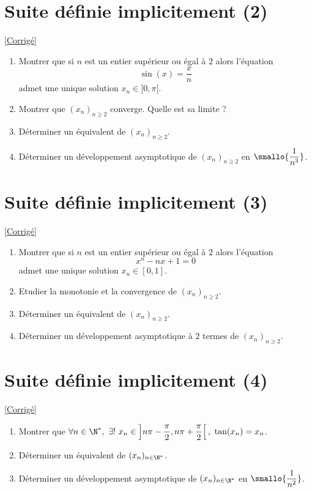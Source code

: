 \documentclass{book}
\begin{document}
	\section{Suite définie implicitement (2) }
	\textcolor{blue}{\hyperref[sec:suite-definie-implicitement-2]{[Corrigé]}}\\
	\label{Suite définie implicitement 2}
	\begin{enumerate}[leftmargin=*]
		\item Montrer que si $n$ est un entier supérieur ou égal à $2$ alors l'équation
		$$\sin(x)=\frac{x}{n}$$
		admet une unique solution $x_n\in ]0,\pi[$.
		\item Montrer que $(x_n)_{n\geq 2}$ converge. Quelle est sa limite ?
		\item Déterminer un équivalent de $(x_n)_{n\geq 2}$.
		\item Déterminer un développement asymptotique de $(x_n)_{n\geq 2}$ en $\smallo{\displaystyle\frac{1}{n^3}}$.
	\end{enumerate}
	
	\section{Suite définie implicitement (3) }
	\textcolor{blue}{\hyperref[sec:suite-definie-implicitement-3]{[Corrigé]}}\\
	\label{Suite définie implicitement 3}
	\begin{enumerate}[leftmargin=*]
		\item Montrer que si $n$ est un entier supérieur ou égal à $2$ alors l'équation
		$$x^n-nx+1=0$$
		admet une unique solution $x_n\in [0,1]$.
		\item Etudier la monotonie et la convergence de $(x_n)_{n\geq 2}$.
		\item Déterminer un équivalent de $(x_n)_{n\geq 2}$.
		\item Déterminer un développement asymptotique à $2$ termes de $(x_n)_{n\geq 2}$.
	\end{enumerate}
	
	\section{Suite définie implicitement (4) }
	\textcolor{blue}{\hyperref[sec:suite-definie-implicitement-4]{[Corrigé]}}\\
	\label{Suite définie implicitement 4}
	\begin{enumerate}[leftmargin=*]
		\item Montrer que $\forall n\in \N^*,\ \exists!\ x_n\in \displaystyle\left]n\pi-\frac{\pi}{2},n\pi+\frac{\pi}{2}\right[,\ \tan(x_n)=x_n$.
		\item Déterminer un équivalent de $(x_n)_{n\in \N^*}$.
		\item Déterminer un développement asymptotique de $(x_n)_{n\in \N^*}$ en $\smallo{\displaystyle\frac{1}{n^2}}$.
	\end{enumerate}
	
\end{document}

